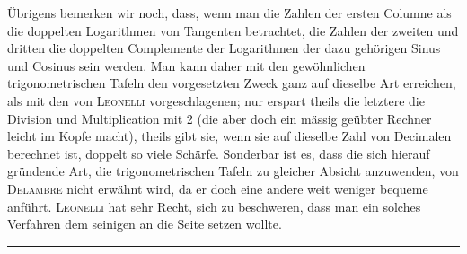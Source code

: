 \noindent Übrigens bemerken wir noch, dass, wenn man die Zahlen der ersten Columne als die doppelten Logarithmen von Tangenten betrachtet, die Zahlen der zweiten und dritten die doppelten Complemente der Logarithmen der dazu gehörigen Sinus und Cosinus sein werden. Man kann daher mit den gewöhnlichen trigonometrischen Tafeln den vorgesetzten Zweck ganz auf dieselbe Art erreichen, als mit den von \textsc{Leonelli} vorgeschlagenen; nur erspart theils die letztere die Division und Multiplication mit 2 (die aber doch ein mässig geübter Rechner leicht im Kopfe macht), theils gibt sie, wenn sie auf dieselbe Zahl von Decimalen berechnet ist, doppelt so viele Schärfe. Sonderbar ist es, dass die sich hierauf gründende Art, die trigonometrischen Tafeln zu gleicher Absicht anzuwenden, von \textsc{Delambre} nicht erwähnt wird, da er doch eine andere weit weniger bequeme anführt. \textsc{Leonelli} hat sehr Recht, sich zu beschweren, dass man ein solches Verfahren dem seinigen an die Seite setzen wollte.\par\medskip\begin{center}\rule{.24\linewidth}{.3pt}\end{center}

